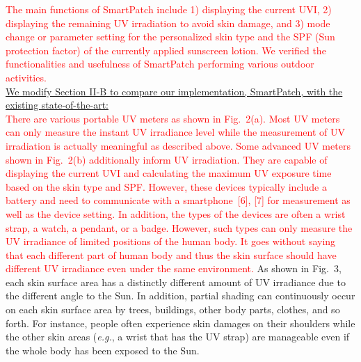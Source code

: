\documentclass[onecolumn]{IEEEconf}
\begin{document}
\begin{description}
\textcolor{red}{The main functions of SmartPatch include 1) displaying the current UVI, 2) displaying the remaining UV irradiation to avoid skin damage, and 3) mode change or parameter setting for the personalized skin type and the SPF (Sun protection factor) of the currently applied sunscreen lotion. We verified the functionalities and usefulness of SmartPatch performing various outdoor activities.}\\

\underline{We modify Section II-B to compare our implementation, SmartPatch, with the existing state-of-the-art:}\\
\textcolor{red}{There are various portable UV meters as shown in Fig.~2(a). Most UV meters can only measure the instant UV irradiance level while the measurement of UV irradiation is actually meaningful as described above. Some advanced UV meters shown in Fig.~2(b) additionally inform UV irradiation. They are capable of displaying the current UVI and calculating the maximum UV exposure time based on the skin type and SPF. However, these devices typically include a battery and need to communicate with a smartphone~[6], [7] for measurement as well as the device setting. In addition, the types of the devices are often a wrist strap, a watch, a pendant, or a badge. However, such types can only measure the UV irradiance of limited positions of the human body. It goes without saying that each different part of human body and thus the skin surface should have different UV irradiance even under the same environment.} As shown in Fig.~3, each skin surface area has a distinctly different amount of UV irradiance due to the different angle to the Sun. In addition, partial shading can continuously occur on each skin surface area by trees, buildings, other body parts, clothes, and so forth. For instance, people often experience skin damages on their shoulders while the other skin areas (\textit{e.g.}, a wrist that has the UV strap) are manageable even if the whole body has been exposed to the Sun.\\
~\\


\end{description}
\end{document}
